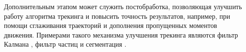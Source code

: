 Дополнительным этапом может служить постобработка, позволяющая улучшить работу алгоритма трекинга и повысить точность результатов, например, при помощи сглаживания траекторий и дополнения пропущенных моментов движения. Примерами такого механизма улучшения трекинга являются фильтр Калмана \cite{1-20}, фильтр частиц \cite{1-21} и сегментация \cite{1-22}.
